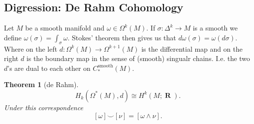 \documentclass[10pt,]{book}
\theoremstyle{plain}
\newtheorem{theorem}{Theorem}[section]
\theoremstyle{definition}
\numberwithin{equation}{section}
\DeclareMathOperator{\RR}{\mathbf{R}}
\begin{document}
\typeout{************************************************}
\typeout{************************************************}
\subsection[Digression: De Rahm Cohomology]{Digression: De Rahm Cohomology}\label{subsection-11}
Let \(M\) be a smooth manifold and \(\omega\in \Omega^k(M)\).
            If \(\sigma\colon\Delta^k \to M\) is a smooth we define \(\omega(\sigma) = \int_\sigma \omega\).
            Stokes' theorem then gives us that \(d\omega (\sigma) = \omega (d\sigma)\).
            Where on the left \(d\colon \Omega^k(M) \to \Omega^{k+1}(M)\) is the differential map and on the right \(d\) is the boundary map in the sense of (smooth) singualr chains.
            I.e. the two \(d\)'s are dual to each other on \(C_*^{\text{smooth}}(M)\).%
\begin{theorem}[de Rahm]\label{theorem-5}
\[H_k(\Omega^*(M), d) \cong H^k(M; \RR).\]
              Under this correspondence
              \[[\omega] \smile [\nu] = [\omega \wedge \nu].\]\end{theorem}
\end{document}
